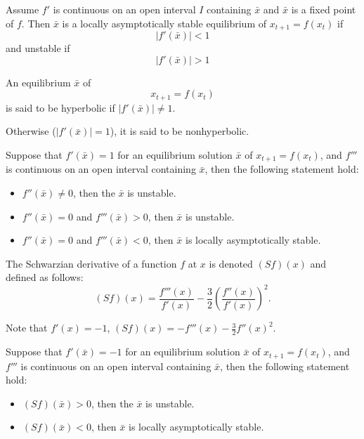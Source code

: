 \begin{theorem}
Assume  $f'$ is continuous on an open interval $I$ containing $\bar x$ and $\bar x$ is a fixed point of $f$. Then $\bar x$ is a locally asymptotically stable equilibrium of $x_{t+1}=f(x_t)$ if
$$|f'(\bar x)|<1$$
and unstable if $$|f'(\bar x)|>1$$
\end{theorem}




\begin{definition}
An equilibrium $\bar x$ of $$x_{t+1}=f(x_t)$$ is said to be hyperbolic if $|f'(\bar x)|\not =1$.

Otherwise ($|f'(\bar x)| =1$), it is said to be nonhyperbolic.
\end{definition}

\begin{theorem}
Suppose that $f'(\bar x) =1$ for an equilibrium solution $\bar x$ of $x_{t+1}=f(x_t)$, and $f'''$ is continuous on an open interval containing $\bar x$, then the following statement hold:
\begin{itemize}
\item $f''(\bar x)\not =0$, then the $\bar x$ is unstable.
\item $f''(\bar x)=0$ and $f'''(\bar x)>0$, then $\bar x$ is unstable.
\item $f''(\bar x)=0$ and $f'''(\bar x)<0$, then $\bar x$ is locally asymptotically stable.
\end{itemize}
\end{theorem}

\begin{definition}
The Schwarzian derivative of a function $f$ at $x$ is denoted $(Sf)(x)$ and defined as follows:
$$(Sf)(x)=\frac{f'''(x)}{f'(x)}-\frac{3}{2}\left ( \frac{f''(x)}{f'(x)} \right )^2.$$
\end{definition}
Note that $f'(x)=-1$, $(Sf)(x)=-f'''(x)-\frac{3}{2} f''(x)^2.$
\begin{theorem}
Suppose that $f'(\bar x) =-1$ for an equilibrium solution $\bar x$ of $x_{t+1}=f(x_t)$, and $f'''$ is continuous on an open interval containing $\bar x$, then the following statement hold:
\begin{itemize}
\item $(Sf)(\bar x)>0$, then the $\bar x$ is unstable.
\item $(Sf)(\bar x)<0$, then $\bar x$ is locally asymptotically stable.
\end{itemize}
\end{theorem}




